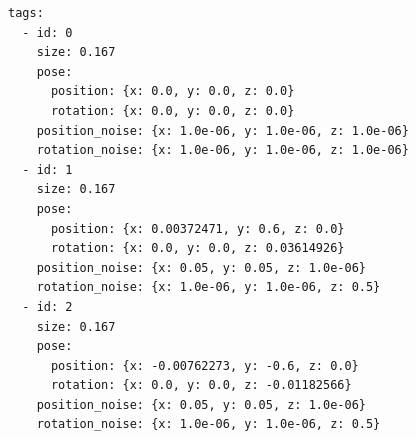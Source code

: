 \begin{lstlisting}[caption={Tagweise Fixierung der Markerlagen in \texttt{tagslam.yaml}. Tag~0 ist als Ursprung in allen Achsen fixiert, 
  die übrigen Tags sind in $z$ sowie in der Verkippung um $x$ und $y$ fixiert.},label={lst:tagslam_tag_noise}]
tags:
  - id: 0
    size: 0.167
    pose:
      position: {x: 0.0, y: 0.0, z: 0.0}
      rotation: {x: 0.0, y: 0.0, z: 0.0}
    position_noise: {x: 1.0e-06, y: 1.0e-06, z: 1.0e-06}
    rotation_noise: {x: 1.0e-06, y: 1.0e-06, z: 1.0e-06}
  - id: 1
    size: 0.167
    pose:
      position: {x: 0.00372471, y: 0.6, z: 0.0}
      rotation: {x: 0.0, y: 0.0, z: 0.03614926}
    position_noise: {x: 0.05, y: 0.05, z: 1.0e-06}
    rotation_noise: {x: 1.0e-06, y: 1.0e-06, z: 0.5}
  - id: 2
    size: 0.167
    pose:
      position: {x: -0.00762273, y: -0.6, z: 0.0}
      rotation: {x: 0.0, y: 0.0, z: -0.01182566}
    position_noise: {x: 0.05, y: 0.05, z: 1.0e-06}
    rotation_noise: {x: 1.0e-06, y: 1.0e-06, z: 0.5}
\end{lstlisting}

